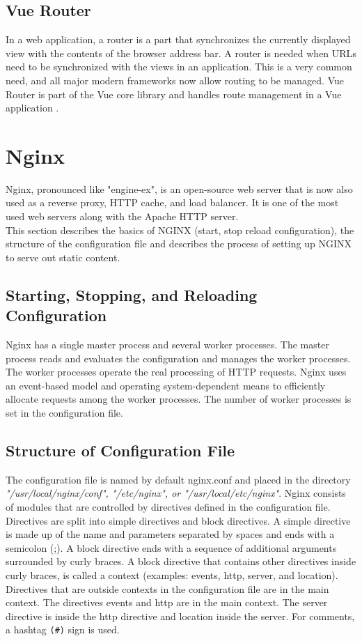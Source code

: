 \subsection{Vue Router }
\label{sec:Vue Router}

In a web application, a router is a part that synchronizes the currently displayed view with the contents of the browser address bar. A router is needed when \gls{URL}s need to be synchronized with the views in an application. This is a very common need, and all major modern frameworks now allow routing to be managed.   Vue Router is part of the Vue core library and handles route management in a Vue application \cite{VueGuide:Online}.


\section{Nginx}
\label{Grundlagen:Nginx}
Nginx, pronounced like "engine-ex", is an open-source web server that is now also used as a reverse proxy, HTTP cache, and load balancer. It is one of the most used web servers along with the Apache HTTP server.\cite{nginxIntro}\\

This section describes the basics of NGINX (start, stop reload configuration), the structure of the configuration file and describes the process of setting up NGINX to serve out static content.

\subsection{Starting, Stopping, and Reloading Configuration}
Nginx has a single master process and several worker processes. The master process reads and evaluates the configuration and manages the worker processes. The worker processes operate the real processing of HTTP requests. Nginx uses an event-based model and operating system-dependent means to efficiently allocate requests among the worker processes. The number of worker processes is set in the configuration file.\cite{nginxIntro}


\subsection{Structure of Configuration File }
The configuration file is named by default nginx.conf and placed in the directory \textit{"/usr/local/nginx/conf", "/etc/nginx", or "/usr/local/etc/nginx"}. Nginx consists of modules that are controlled by directives defined in the configuration file. Directives are split into simple directives and block directives. A simple directive is made up of the name and parameters separated by spaces and ends with a semicolon (;). A block directive ends with a sequence of additional arguments surrounded by curly braces. A block directive that contains other directives inside curly braces, is called a context (examples: events, http, server, and location). Directives that are outside contexts in the configuration file are in the main context. The directives events and http are in the main context. The server directive is inside the http directive and location inside the server. For comments, a hashtag \lstinline{(#)} sign is used.\cite*{nginxIntro}

